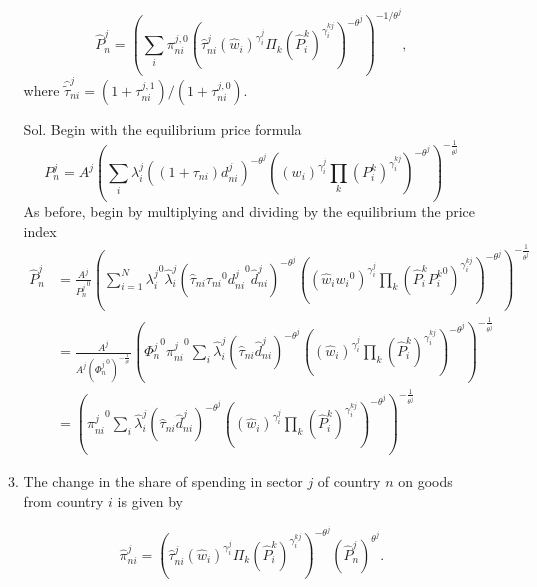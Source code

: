 \documentclass[12pt,oneside,reqno]{article}
\begin{document}
\begin{enumerate}[label=\roman*., leftmargin=*]
\begin{enumerate}
\begin{equation*}
\hat{P}_{n}^{j}=\left(\sum_{i} \pi_{n i}^{j, 0}\left(\hat{\tau}_{n i}^{j}\left(\hat{w}_{i}\right)^{\gamma_{i}^{j}} \Pi_{k}\left(\hat{P}_{i}^{k}\right)^{\gamma_{i}^{kj}}\right)^{-\theta^{j}}\right)^{-1 / \theta^{j}},
\end{equation*}
where $\hat{\tilde{\tau}}_{n i}^{j}=\left(1+\tau_{n i}^{j, 1}\right) /\left(1+\tau_{n i}^{j, 0}\right)$.
\item[Sol.] Begin with the equilibrium price formula 
\begin{equation*}
    P_n^j = A^j \left( \sum_i \lambda_i^j \left((1+\tau_{ni}) d_{ni}^j\right)^{-\theta^j} \left((w_i)^{\gamma_i^j} \prod_k (P_i^k)^{\gamma_i^{kj}}\right)^{-\theta^j} \right)^{-\frac{1}{\theta^j}} 
\end{equation*}
As before, begin by multiplying and dividing by the equilibrium the price index
\begin{align*}
    \hat{P}_n^j &= \frac{A^j}{{P_n^j}^0 }\left( \sum_{i=1}^N {\lambda_i^j}^0 \hat{\lambda}_i^j \left(\hat{\tau}_{ni} {\tau_{ni}}^0 {d_{ni}^j}^0 \hat{d}_{ni}^j\right)^{-\theta^j} \left((\hat{w}_i {w_i}^0)^{\gamma_i^j} \prod_k (\hat{P}_i^k {P_i^k}^0)^{\gamma_i^{kj}}\right)^{-\theta^j} \right)^{-\frac{1}{\theta^j}} \\
    &= \frac{A^j}{A^j\left({{\Phi_n^j}^0}\right)^{-\frac{1}{\theta^j}}} \left( {\Phi^j_n}^0 {\pi_{ni}^j}^0 \sum_i \hat{\lambda}_i^j \left(\hat{\tau}_{ni} \hat{d}_{ni}^j\right)^{-\theta^j} \left((\hat{w}_i )^{\gamma_i^j} \prod_k (\hat{P}_i^k )^{\gamma_i^{kj}}\right)^{-\theta^j} \right)^{-\frac{1}{\theta^j}} \\
    &= \left( {\pi_{ni}^j}^0 \sum_i \hat{\lambda}_i^j \left(\hat{\tau}_{ni} \hat{d}_{ni}^j\right)^{-\theta^j} \left((\hat{w}_i )^{\gamma_i^j} \prod_k (\hat{P}_i^k )^{\gamma_i^{kj}}\right)^{-\theta^j} \right)^{-\frac{1}{\theta^j}} 
\end{align*}

\item  The change in the share of spending in sector $j$ of country $n$ on goods from country $i$ is given by

\begin{equation*}
\hat{\pi}_{n i}^{j}=\left(\hat{\tau}_{n i}^{j}\left(\hat{w}_{i}\right)^{\gamma_{i}^{j}} \Pi_{k}\left(\hat{P}_{i}^{k}\right)^{\gamma_{i}^{k j}}\right)^{-\theta^{j}}\left(\hat{P}_{n}^{j}\right)^{\theta^{j}} .
\end{equation*}


\end{enumerate}
\end{enumerate}
\end{document}
